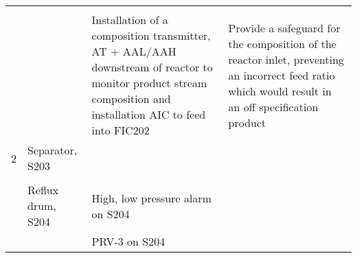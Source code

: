 \begin{table}[h]
\begin{tabularx}{\linewidth}{@{}lp{3cm}XX@{}}
     &                           &                                                                                                                                                               &                                                                                                                                                                                                                                                         \\ \cmidrule(l){3-4} 
     &                           & Installation of a composition transmitter, AT + AAL/AAH downstream of reactor to monitor product stream composition and installation AIC to feed into FIC202  & Provide a safeguard for the composition of the reactor inlet, preventing an incorrect feed ratio which would result in an off specification product                                                   \\ \midrule
2    & Separator, S203           &                                                                                                                                                               &                                                                                                                                                                                                                                                         \\ \cmidrule(l){3-4} 
     &                           &                                                                                                                                                               &                                                                                                                                                                                                                                                         \\ \cmidrule(l){2-4} 
     & Reflux drum, S204         & High, low pressure alarm on S204                                                                                                                              &                                                                                                                                                                                                                                                         \\ \cmidrule(l){3-4} 
     &                           & PRV-3 on S204                                                                                                                                                 &                                                                                                                                                                                                                                                         \\ \cmidrule(l){3-4} 

\end{tabularx}
\end{table}
